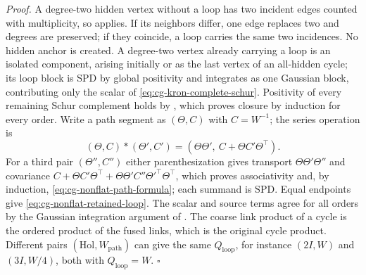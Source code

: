 \noindent\emph{Proof.}
A degree-two hidden vertex without a loop has two incident edges counted with
multiplicity, so  applies. If its neighbors
differ, one edge replaces two and degrees are preserved; if they coincide, a
loop carries the same two incidences. No hidden anchor is created. A degree-two
vertex already carrying a loop is an isolated component, arising initially or as
the last vertex of an all-hidden cycle; its loop block is SPD by global
positivity and integrates as one Gaussian block, contributing only the scalar
of \eqref{eq:cg-kron-complete-schur}. Positivity of every remaining Schur
complement holds by , which proves closure
by induction for every order. Write a path segment as \((\Theta,C)\) with
\(C=W^{-1}\); the series operation is
\begin{equation}
(\Theta,C)*(\Theta',C')
=(\Theta\Theta',\ C+\Theta C'\Theta^\top).
\label{eq:cg-nonflat-series-composition}
\end{equation}
For a third pair \((\Theta'',C'')\) either parenthesization gives transport
\(\Theta\Theta'\Theta''\) and covariance
\(C+\Theta C'\Theta^\top+\Theta\Theta'C''\Theta'^\top\Theta^\top\), which proves
associativity and, by induction, \eqref{eq:cg-nonflat-path-formula}; each
summand is SPD. Equal endpoints give \eqref{eq:cg-nonflat-retained-loop}. The
scalar and source terms agree for all orders by the Gaussian integration
argument of . The coarse link product of a
cycle is the ordered product of the fused links, which is the original cycle
product. Different pairs \((\mathrm{Hol},W_{\mathrm{path}})\) can give the same
\(Q_{\mathrm{loop}}\), for instance \((2I,W)\) and \((3I,W/4)\), both with
\(Q_{\mathrm{loop}}=W\). \(\square\)

